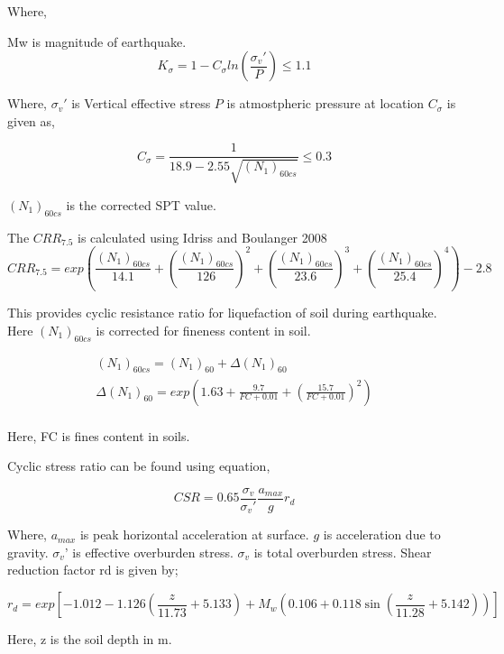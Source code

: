 Where,

Mw is magnitude of earthquake.
\begin{equation}
K_\sigma = 1 - C_\sigma ln (\frac{\sigma_v'}{P}) \leq 1.1
\end{equation}

Where,
$\sigma_v'$ is Vertical effective stress
$P$ is atmostpheric pressure at location
$C_\sigma$ is given as,

\begin{equation}
C_\sigma = \frac{1}{18.9-2.55\sqrt{({N_1})_{60cs}}} \leq 0.3
\end{equation}

$({N_1})_{60cs}$ is the corrected SPT value.

The $CRR_{7.5}$ is calculated using Idriss and Boulanger 2008
\begin{equation}
CRR_{7.5} = exp(\frac{({N_1})_{60cs}}{14.1} + (\frac{({N_1})_{60cs}}{126})^2 + (\frac{({N_1})_{60cs}}{23.6})^3 + (\frac{({N_1})_{60cs}}{25.4})^4) - 2.8
\end{equation}

This provides cyclic resistance ratio for liquefaction of soil during earthquake. Here $({N_1})_{60cs}$ is corrected for fineness content in soil.

\begin{gather}
({N_1})_{60cs} = ({N_1})_{60} + \Delta({N_1})_{60} \\
\Delta({N_1})_{60} = exp(1.63 + \frac{9.7}{FC+0.01} + (\frac{15.7}{FC+0.01})^2 ) \\
\end{gather}

Here, FC is fines content in soils.

Cyclic stress ratio can be found using equation,

\begin{equation}
CSR = 0.65 \frac{\sigma_v}{\sigma_v'} \frac{a_{max}}{g} r_d
\end{equation}

Where,
$a_{max}$ is peak horizontal acceleration at surface.
$g$ is acceleration due to gravity.
$\sigma_v’$ is effective overburden stress.
$\sigma_v$ is total overburden stress.
Shear reduction factor rd is given by;

\begin{equation}
r_d = exp[ -1.012 - 1.126 (\frac{z}{11.73} + 5.133) + M_w( 0.106 + 0.118 \sin ( \frac{z}{11.28} +5.142 ) ) ]
\end{equation}

Here, z is the soil depth in m.

